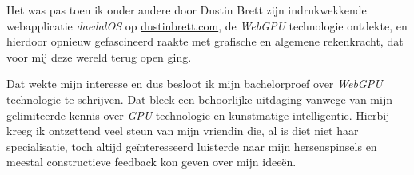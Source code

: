 \bigbreak{}

Het was pas toen ik onder andere door Dustin Brett zijn indrukwekkende webapplicatie \textit{daedalOS} op \href{https://dustinbrett.com/}{dustinbrett.com}, de \textit{WebGPU} technologie ontdekte, en hierdoor opnieuw gefascineerd raakte met grafische en algemene rekenkracht, dat voor mij deze wereld terug open ging.

\bigbreak{}

Dat wekte mijn interesse en dus besloot ik mijn bachelorproef over \textit{WebGPU} technologie te schrijven. Dat bleek een behoorlijke uitdaging vanwege van mijn gelimiteerde kennis over \textit{GPU} technologie en kunstmatige intelligentie. Hierbij kreeg ik ontzettend veel steun van mijn vriendin die, al is diet niet haar specialisatie, toch altijd geïnteresseerd luisterde naar mijn hersenspinsels en meestal constructieve feedback kon geven over mijn ideeën.